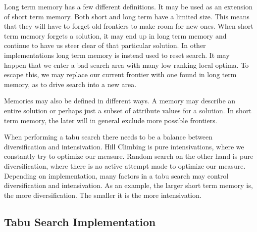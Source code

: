 Long term memory has a few different definitions. It may be used as an extension of short term memory. Both short and long term have a limited size. This means that they will have to forget old frontiers to make room for new ones. When short term memory forgets a solution, it may end up in long term memory and continue to have us steer clear of that particular solution. In other implementations long term memory is instead used to reset search. It may happen that we enter a bad search area with many low ranking local optima. To escape this, we may replace our current frontier with one found in long term memory, as to drive search into a new area.

Memories may also be defined in different ways. A memory may describe an entire solution or perhaps just a subset of attribute values for a solution. In short term memory, the later will in general exclude more possible frontiers. 

When performing a tabu search there needs to be a balance between diversification and intensivation. Hill Climbing is pure intensivations, where we constantly try to optimize our measure. Random search on the other hand is pure diversification, where there is no active attempt made to optimize our measure. Depending on implementation, many factors in a tabu search may control diversification and intensivation. As an example, the larger short term memory is, the more diversification. The smaller it is the more intensivation.


\subsection{Tabu Search Implementation}


\begin{minipage}{\linewidth}

\end{minipage}

